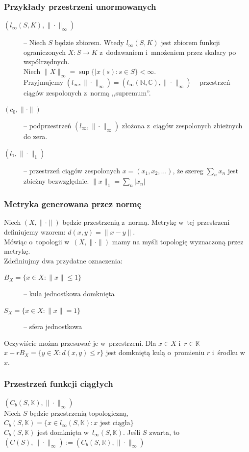 \documentclass[10pt]{article}
\renewcommand{\[}{\begin{equation}}
\renewcommand{\]}{\end{equation}}
\newcommand{\N}{{\ensuremath{\mathbb N}}}
\newcommand{\C}{{\ensuremath{\mathbb C}}}
\newcommand{\R}{{\ensuremath{\mathbb R}}}
\newcommand{\K}{\ensuremath{\mathbb{K}}}
\newcounter{numer}
\begin{document}
\subsubsection{Przykłady przestrzeni unormowanych} 
\begin{description}
 	 \item[$( l_\infty(S,K), \|\cdot \|_\infty)$] -- Niech $S$ będzie zbiorem. Wtedy $l_\infty (S,K)$ jest zbiorem funkcji ograniczonych $X:S\to K$ 
		z~dodawaniem i~mnożeniem przez skalary po współrzędnych.\\
		Niech $\|X\|_\infty = \sup \{|x(s)\colon s\in S\} < \infty$.\\
		Przyjmujemy $(l_\infty, \|\cdot\|_\infty) = ( l_\infty(\N,\C), \|\cdot\|_\infty )$ 
		-- przestrzeń ciągów zespolonych z~normą ,,supremum''.
	  \item[$(c_0, \|\cdot\|)$] -- podprzestrzeń $(l_\infty, \|\cdot \|_\infty )$ złożona z~ciągów zespolonych zbieżnych do zera.
	  \item[$(l_1, \|\cdot\|_1)$] -- przestrzeń ciągów zespolonych $x= (x_1,x_2,\ldots)$, że szereg $\sum_n x _n$ jest zbieżny  
		bezwzględnie. $\|x\| _1 = \sum_n |x_n|$
\end{description}
 \subsubsection{Metryka generowana przez normę }
 Niech  $(X,\|\cdot\|)$ będzie przestrzenią z~normą. Metrykę w~tej przestrzeni definiujemy  wzorem: $d(x,y) = \|x-y\|$.\\
Mówiąc o~topologii w~$(X,\|\cdot\|)$ mamy na myśli topologię wyznaczoną przez metrykę.\\
Zdefiniujmy dwa przydatne oznaczenia:
\begin{description}
  \item[$B_X = \{ x\in X: \|x\|\le 1\} $] -- kula jednostkowa domknięta
  \item[$S_X = \{ x \in X : \|x\| = 1 \}$] -- sfera jednostkowa 
\end{description}
Oczywiście można przesuwać je w~przestrzeni. Dla $x\in X$ i~$r\in \K$ 
$x+rB_X = \{ y \in X: d(x,y) \le r\}$ jest domkniętą kulą o~promieniu $r$ i~środku w~$x$. 
\subsubsection{Przestrzeń funkcji ciągłych}
$(C_b (S, \K), \|\cdot\|_\infty )$ \\
Niech $S$ będzie przestrzenią topologiczną, $C_b(S,\K) = \{ x \in l_\infty(S,\K): x\textrm{ jest ciągła}\}$\\
$C_b(S,\K)$ jest domknięta w~$l_\infty(S,\K)$. Jeśli $S$ zwarta, to $(C(S), \|\cdot\|_\infty) := (C_b (S,\R) , \|\cdot\|_\infty)$
\end{document}
